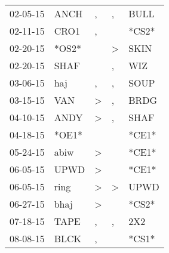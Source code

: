 \begin{supertabular}{p{0.07\textwidth}p{0.06\textwidth}p{0.02\textwidth}p{0.02\textwidth}p{0.06\textwidth}}
          02-05-15\textsuperscript{} &           ANCH\textsuperscript{} &                , &                , &           BULL\textsuperscript{} \\
          02-11-15\textsuperscript{} &           CRO1\textsuperscript{} &                , &                  &                            *CS2* \\
          02-20-15\textsuperscript{} &                            *OS2* &                  &     \textgreater &           SKIN\textsuperscript{} \\
          02-20-15\textsuperscript{} &           SHAF\textsuperscript{} &                  &                , &            WIZ\textsuperscript{} \\
          03-06-15\textsuperscript{} &            haj\textsuperscript{} &                , &                , &           SOUP\textsuperscript{} \\
          03-15-15\textsuperscript{} &            VAN\textsuperscript{} &     \textgreater &                , &           BRDG\textsuperscript{} \\
          04-10-15\textsuperscript{} &           ANDY\textsuperscript{} &     \textgreater &                , &           SHAF\textsuperscript{} \\
          04-18-15\textsuperscript{} &                            *OE1* &                  &                  &                            *CE1* \\
          05-24-15\textsuperscript{} &           abiw\textsuperscript{} &     \textgreater &                  &                            *CE1* \\
          06-05-15\textsuperscript{} &           UPWD\textsuperscript{} &     \textgreater &                  &                            *CE1* \\
          06-05-15\textsuperscript{} &           ring\textsuperscript{} &     \textgreater &     \textgreater &           UPWD\textsuperscript{} \\
          06-27-15\textsuperscript{} &           bhaj\textsuperscript{} &     \textgreater &                  &                            *CS2* \\
          07-18-15\textsuperscript{} &           TAPE\textsuperscript{} &                , &                , &            2X2\textsuperscript{} \\
          08-08-15\textsuperscript{} &           BLCK\textsuperscript{} &                , &                  &                            *CS1* \\

\end{supertabular}
